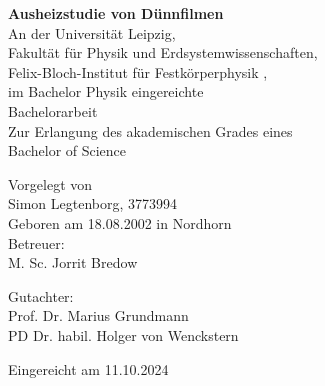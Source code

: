 \begin{titlepage}
    \begin{center}
        \vfill
        \Huge
        \textbf{Ausheizstudie von \heo Dünnfilmen} \\

        \vfill
        \Large
        An der Universität Leipzig, \\
        Fakultät für Physik und Erdsystemwissenschaften, \\
        Felix-Bloch-Institut für Festkörperphysik , \\
        im Bachelor Physik eingereichte \\

        \vfill
        \Huge
        Bachelorarbeit\\

        \vfill
        \Large
        Zur Erlangung des akademischen Grades eines \\
        Bachelor of Science

        \vfill
        Vorgelegt von \\
        Simon Legtenborg, 3773994 \\
        Geboren am 18.08.2002 in Nordhorn \\


        \vfill
        Betreuer: \\
        M. Sc. Jorrit Bredow

        \vfill
        Gutachter: \\
        Prof. Dr. Marius Grundmann \\
        PD Dr. habil. Holger von Wenckstern


        \vfill
        Eingereicht am 11.10.2024
        \vfill


    \end{center}
\end{titlepage}
